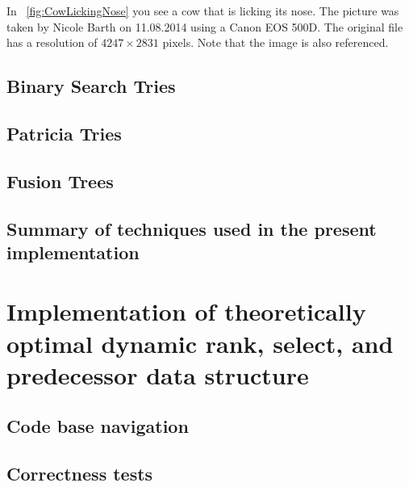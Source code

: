In \figurename~\ref{fig:CowLickingNose} you see a cow that is licking its nose. The picture was taken by Nicole Barth on 11.08.2014 using a Canon EOS 500D. The original file has a resolution of $4247 \times 2831$ pixels.
Note that the image is also referenced.

\subsection{Binary Search Tries}

\subsection{Patricia Tries}

\subsection{Fusion Trees}

\subsection{Summary of techniques used in the present implementation}

\section{Implementation of theoretically optimal dynamic rank, select, and predecessor data structure}

\subsection{Code base navigation}

\subsection{Correctness tests}

